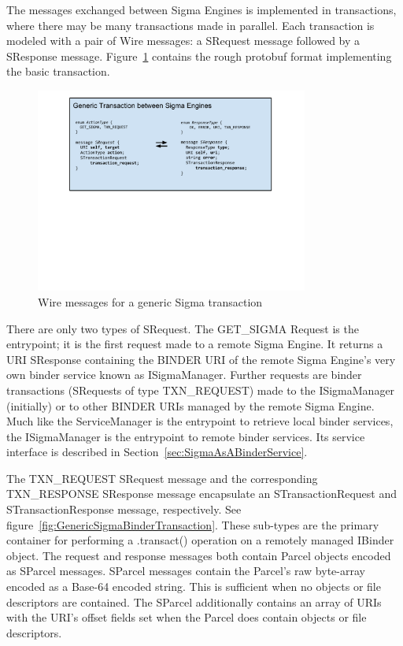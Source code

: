\documentclass[prodmode]{acmlarge}
\begin{document}
The messages exchanged between Sigma Engines is implemented in transactions, where there may be many transactions made in parallel. Each transaction is modeled with a pair of Wire messages: a SRequest message followed by a SResponse message. Figure~\ref{fig:GenericSigmaTransaction} contains the rough protobuf format implementing the basic transaction.

\begin{figure}[h!]
\centering
\includegraphics[width=0.8\textwidth]{drawings/WireTransaction.pdf}
\caption{Wire messages for a generic Sigma transaction}
\label{fig:GenericSigmaTransaction}
\end{figure}

There are only two types of SRequest. The GET\_SIGMA Request is the entrypoint; it is the first request made to a remote Sigma Engine. It returns a URI SResponse containing the BINDER URI of the remote Sigma Engine's very own binder service known as ISigmaManager. Further requests are binder transactions (SRequests of type TXN\_REQUEST) made to the ISigmaManager (initially) or to other BINDER URIs managed by the remote Sigma Engine. Much like the ServiceManager is the entrypoint to retrieve local binder services, the ISigmaManager is the entrypoint to remote binder services. Its service interface is described in Section~\ref{sec:SigmaAsABinderService}.

The TXN\_REQUEST SRequest message and the corresponding TXN\_RESPONSE SResponse message encapsulate an STransactionRequest and STransactionResponse message, respectively. See figure~\ref{fig:GenericSigmaBinderTransaction}. These sub-types are the primary container for performing a .transact() operation on a remotely managed IBinder object. The request and response messages both contain Parcel objects encoded as SParcel messages. SParcel messages contain the Parcel's raw byte-array encoded as a Base-64 encoded string. This is sufficient when no objects or file descriptors are contained. The SParcel additionally contains an array of URIs with the URI's offset fields set when the Parcel does contain objects or file descriptors.
\end{document}
